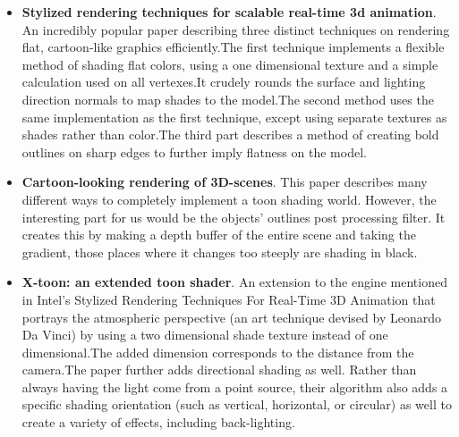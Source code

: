 \documentclass{acmsiggraph}
\begin{document}
\begin{itemize}
\item
\textbf{Stylized rendering techniques for scalable real-time 3d animation}.
An incredibly popular paper describing three distinct techniques on rendering
flat, cartoon-like graphics efficiently.The first technique implements a
flexible method of shading flat colors, using a one dimensional texture and a
simple calculation used on all vertexes.It crudely rounds the surface and
lighting direction normals to map shades to the model.The second method uses
the same implementation as the first technique, except using separate textures
as shades rather than color.The third part describes a method of creating
bold outlines on sharp edges to further imply flatness on the
model.\cite{lake2000srt}

\item
\textbf{Cartoon-looking rendering of 3D-scenes}.
This paper describes many different ways to completely implement a toon shading
world. However, the interesting part for us would be the objects' outlines post
processing filter. It creates this by making a depth buffer of the entire scene
and taking the gradient, those places where it changes too steeply are shading
in black.
\cite{decaudin1996clr}

\item
\textbf{X-toon: an extended toon shader}.
An extension to the engine mentioned in Intel's Stylized Rendering Techniques
For Real-Time 3D Animation that portrays the atmospheric perspective (an art
technique devised by Leonardo Da Vinci) by using a two dimensional shade
texture instead of one dimensional.The added dimension corresponds to the
distance from the camera.The paper further adds directional shading as well.
Rather than always having the light come from a point source, their algorithm
also adds a specific shading orientation (such as vertical, horizontal, or
circular) as well to create a variety of effects, including
back-lighting.\cite{barla2006xte}
\end{itemize}



\end{document}
